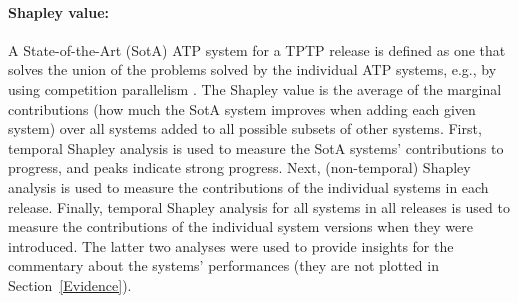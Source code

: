 \documentclass[runningheads]{llncs}
\begin{document}
\paragraph{Shapley value:}
A State-of-the-Art (SotA) ATP system for a TPTP release is defined as one that solves the union 
of the problems solved by the individual ATP systems, e.g., by using competition parallelism
\cite{SS94-PPAI}.
The Shapley value \cite{XH+12} is the average of the marginal contributions (how much the SotA
system improves when adding each given system) over all systems added to all possible subsets 
of other systems.
First, temporal Shapley analysis \cite{KF+19} is used to measure the SotA systems' contributions to 
progress, and peaks indicate strong progress.
Next, (non-temporal) Shapley analysis \cite{FK+16} is used to measure the contributions of the
individual systems in each release.
Finally, temporal Shapley analysis for all systems in all releases is used to measure the
contributions of the individual system versions when they were introduced.
The latter two analyses were used to provide insights for the commentary about the systems' 
performances (they are not plotted in Section~\ref{Evidence}).
\end{document}
